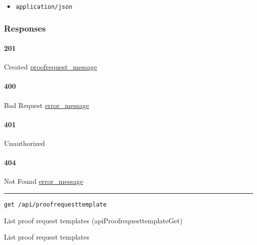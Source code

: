 \begin{itemize}
\tightlist
\item
  \texttt{application/json}
\end{itemize}

\hypertarget{responses-103}{%
\subsubsection{Responses}\label{responses-103}}

\hypertarget{section-338}{%
\paragraph{201}\label{section-338}}

Created \protect\hyperlink{proofrequest_message}{proofrequest\_message}

\hypertarget{section-339}{%
\paragraph{400}\label{section-339}}

Bad Request \protect\hyperlink{error_message}{error\_message}

\hypertarget{section-340}{%
\paragraph{401}\label{section-340}}

Unauthorized \protect\hyperlink{}{}

\hypertarget{section-341}{%
\paragraph{404}\label{section-341}}

Not Found \protect\hyperlink{error_message}{error\_message}

\begin{center}\rule{0.5\linewidth}{\linethickness}\end{center}

\protect\hypertarget{apiProofrequesttemplateGet}{}{}

\begin{verbatim}
get /api/proofrequesttemplate
\end{verbatim}

List proof request templates ({apiProofrequesttemplateGet})

List proof request templates

